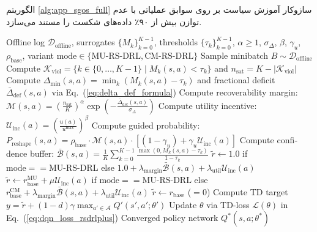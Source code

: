\documentclass[oneside,openany,phd]{TMU-Thesis}
\begin{document}
الگوریتم \ref{alg:app_sgos_full} سازوکار آموزش سیاست بر روی سوابق عملیاتی با عدم توازن بیش از ۹۰٪ داده‌های شکست را مستند می‌سازد.

\begin{algorithm}[htbp]
\caption{الگوریتم سنتز غیربرخط سیاست با هدایت مشخصه‌ها (\sgos)}
\label{alg:app_sgos_full}
\begin{latin}
\small
\begin{algorithmic}[1]
\REQUIRE Offline log $\mathcal{D}_{\text{offline}}$, surrogates $\{M_k\}_{k=0}^{K-1}$, thresholds $\{\tau_k\}_{k=0}^{K-1}$, $\alpha \ge 1$, $\sigma_\Delta$, $\beta$, $\gamma_u$, $\rho_{\text{base}}$, variant $\text{mode} \in \{\text{MU-RS-DRL}, \text{CM-RS-DRL}\}$
    \STATE Sample minibatch $B \sim \mathcal{D}_{\text{offline}}$
        \STATE Compute $\mathcal{K}_{\text{viol}} = \{k \in \{0, \dots, K-1\} \mid M_k(s, a) < \tau_k\}$ and $n_{\text{sat}} = K - |\mathcal{K}_{\text{viol}}|$
        \STATE Compute $\Delta_{\min}(s, a) = \min_k (M_k(s, a) - \tau_k)$ and fractional deficit $\bar{\Delta}_{\text{def}}(s, a)$ via Eq.~(\ref{eq:delta_def_formula})
        \STATE Compute recoverability margin: $\mathcal{M}(s, a) = \left(\frac{n_{\text{sat}}}{K}\right)^\alpha \exp\left(-\frac{\bar{\Delta}_{\text{def}}(s, a)}{\sigma_\Delta}\right)$
        \STATE Compute utility incentive: $\mathcal{U}_{\text{inc}}(a) = \left(\frac{u(a)}{u^{\max}}\right)^\beta$
        \STATE Compute guided probability: $P_{\text{reshape}}(s, a) = \rho_{\text{base}} \cdot \mathcal{M}(s, a) \cdot \left[(1 - \gamma_u) + \gamma_u \mathcal{U}_{\text{inc}}(a)\right]$
            \STATE Compute confidence buffer: $\bar{\mathcal{B}}(s, a) = \frac{1}{K} \sum_{k=0}^{K-1} \frac{\max(0, M_k(s, a) - \tau_k)}{1 - \tau_k}$
        \ENDIF
            \STATE $\tilde{r} \leftarrow 1.0$ if $\text{mode} == \text{MU-RS-DRL}$ else $1.0 + \lambda_{\text{margin}}\bar{\mathcal{B}}(s, a) + \lambda_{\text{util}}\mathcal{U}_{\text{inc}}(a)$
            \STATE $\tilde{r} \leftarrow r_{\text{base}}^{\text{MU}} + \mu \mathcal{U}_{\text{inc}}(a)$ if $\text{mode} == \text{MU-RS-DRL}$ else $r_{\text{base}}^{\text{CM}} + \lambda_{\text{margin}}\bar{\mathcal{B}}(s, a) + \lambda_{\text{util}}\mathcal{U}_{\text{inc}}(a)$
        \ELSE
            \STATE $\tilde{r} \leftarrow r_{\text{base}}$ ($= 0$)
        \ENDIF
        \STATE Compute TD target $y = \tilde{r} + (1 - d)\gamma \max_{a' \in \mathcal{A}} Q'(s', a'; \theta')$
    \ENDFOR
    \STATE Update $\theta$ via TD-loss $\mathcal{L}(\theta)$ in Eq.~(\ref{eq:dqn_loss_rsdrlplus})
\ENDFOR
\RETURN Converged policy network $Q^*(s, a; \theta^*)$
\end{algorithmic}
\end{latin}
\end{algorithm}
\end{document}
